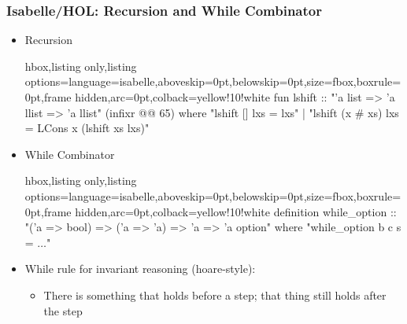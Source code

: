 \documentclass[aspectratio=169,10pt]{beamer}
\begin{document}
\begin{frame}[fragile]
  \frametitle{Isabelle/HOL: Recursion and While Combinator}
  \begin{itemize}
    \item Recursion

\begin{tcblisting}{hbox,listing only,listing options={language=isabelle,aboveskip=0pt,belowskip=0pt},size=fbox,boxrule=0pt,frame hidden,arc=0pt,colback=yellow!10!white}
fun lshift :: "'a list => 'a llist => 'a llist" (infixr @@ 65) where
  "lshift [] lxs = lxs"
| "lshift (x # xs) lxs = LCons x (lshift xs lxs)"
\end{tcblisting}
  \item While Combinator
\begin{tcblisting}{hbox,listing only,listing options={language=isabelle,aboveskip=0pt,belowskip=0pt},size=fbox,boxrule=0pt,frame hidden,arc=0pt,colback=yellow!10!white}
definition while_option :: "('a => bool) => ('a => 'a) => 'a => 'a option" where
"while_option b c s = $\ldots$"
\end{tcblisting}
    \item While rule for invariant reasoning (hoare-style):
          \begin{itemize}
            \item There is something that holds before a step; that thing still holds after the step
          \end{itemize}
          \end{itemize}
\end{frame}
\end{document}
